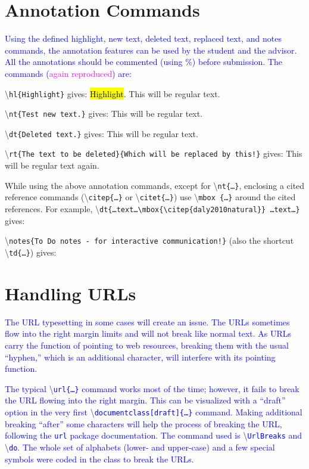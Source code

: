 \documentclass[phd]{ndsu-thesis-2022}
\newcommand\italk[1]{\textcolor{blue}{#1}}  %
\newcommand\cmd[1]{\textbackslash\texttt{#1}}  %
\begin{document}
\section{Annotation Commands}
\italk{Using the defined highlight, new text, deleted text, replaced text, and notes commands, the annotation features can be used by the student and the advisor. All the annotations should be commented (using \%) before submission. The commands (\textcolor{magenta}{again reproduced}) are:} 

\textbackslash\texttt{hl\{Highlight\}} gives: \hl{Highlight}. This will be regular text. 

\textbackslash\texttt{nt\{Test new text.\}} gives:  This will be regular text. 

\textbackslash\texttt{dt\{Deleted text.\}} gives:  This will be regular text. 

\textbackslash\texttt{rt\{The text to be deleted\}\{Which will be replaced by this!\}} gives:  This will be regular text again. 

\vspace{1.5ex}
While using the above annotation commands, except for \cmd{nt\{\ldots\}}, enclosing a cited reference commands (\cmd{citep\{\ldots\}} or \cmd{citet\{\ldots\}}) use \cmd{mbox
\{\ldots\}} around the cited references. For example, \cmd{dt\{\ldots text\ldots \cmd{mbox\{\cmd{citep\{daly2010natural\}}\}} \ldots text\ldots\}} 
gives:  

\vspace{1.5ex}
\textbackslash\texttt{notes\{To Do notes - for interactive communication!\}} (also the shortcut \cmd{td\{\ldots\}}) gives:  

\section{Handling URLs}
\italk{The URL typesetting in some cases will create an issue. The URLs sometimes flow into the right margin limits and will not break like normal text. As URLs carry the function of pointing to web resources, breaking them with the usual ``hyphen,'' which is an additional character, will interfere with its pointing function.} 

\italk{The typical \cmd{url\{\ldots\}} command works most of the time; however, it fails to break the URL flowing into the right margin. This can be visualized with a ``draft'' option in the very first \cmd{documentclass[draft]\{\ldots\}} command. Making additional breaking ``after'' some characters will help the process of breaking the URL, following the \texttt{url} package documentation. The command used is \cmd{UrlBreaks} and \cmd{do}. The whole set of alphabets (lower- and upper-case) and a few special symbols were coded in the class to break the URLs.}
\end{document}
